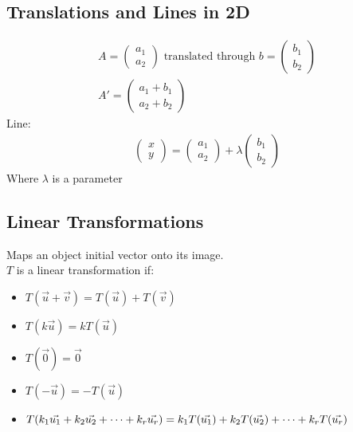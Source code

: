 \documentclass[10pt, a4paper, titlepage]{article}
\begin{document}
\begin{multicols*}{3}
\subsection{Translations and Lines in 2D}
\begin{gather}
	A=\begin{pmatrix}a_1\\ a_2\end{pmatrix}
	\text{ translated through }
	b=\begin{pmatrix}b_1\\ b_2\end{pmatrix}\\
	A'=\begin{pmatrix}a_1+b_1\\ a_2+b_2\end{pmatrix}
\end{gather}
Line:
\begin{align}
	\begin{pmatrix}x\\ y\end{pmatrix}=\begin{pmatrix}a_1\\ a_2\end{pmatrix}+\lambda \begin{pmatrix}b_1\\ b_2\end{pmatrix}
\end{align}
Where $\lambda$ is a parameter\\

\dotfill
\subsection{Linear Transformations}
Maps an object initial vector onto its image.\\
$T$ is a linear transformation if:
\begin{itemize}
	\item $T(\vec{u}+\vec{v})=T(\vec{u})+T(\vec{v})$
	\item $T(k\vec{u})=kT(\vec{u})$
	\item $T(\vec{0})=\vec{0}$
	\item $T(-\vec{u})=-T(\vec{u})$
	\item $T(k_1\vec{u_1}+k_2\vec{u_2}+\dots +k_r\vec{u_r})\\ =k_1T(\vec{u_1})+k_2T(\vec{u_2})+\dots +k_rT(\vec{u_r})$
\end{itemize}
\dotfill

\end{multicols*}
\end{document}
